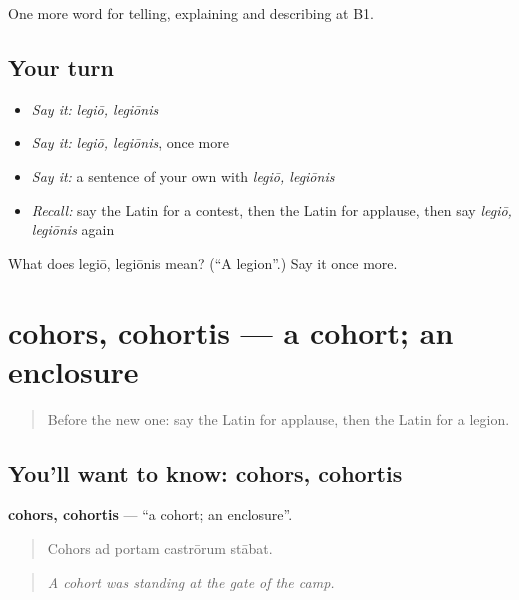 \begin{grammarlens}[title={What you've built}]
One more word for telling, explaining and describing at B1.
\end{grammarlens}

\subsection*{Your turn}
\begin{itemize}
\raggedright
  \item \emph{Say it:} \emph{legiō, legiōnis}
  \item \emph{Say it:} \emph{legiō, legiōnis}, once more
  \item \emph{Say it:} a sentence of your own with \emph{legiō, legiōnis}
  \item \emph{Recall:} say the Latin for a contest, then the Latin for applause, then say \emph{legiō, legiōnis} again
\end{itemize}

\begin{tcolorbox}[breakable,colback=teal!4,colframe=teal!35!black,title={Before you move on}]
What does legiō, legiōnis mean? (\textquotedblleft{}A legion\textquotedblright{}.) Say it once more.
\end{tcolorbox}
\section[cohors, cohortis]{cohors, cohortis — a cohort; an enclosure}

\label{lesson:LA-C338-cohors}



\begin{quote}
Before the new one: say the Latin for applause, then the Latin for a legion.
\end{quote}

\subsection*{You'll want to know: cohors, cohortis}
\textbf{cohors, cohortis} — \textquotedblleft{}a cohort; an enclosure\textquotedblright{}.

\begin{quote}
Cohors ad portam castrōrum stābat.
\end{quote}

\begin{quote}
\emph{A cohort was standing at the gate of the camp.}
\end{quote}

